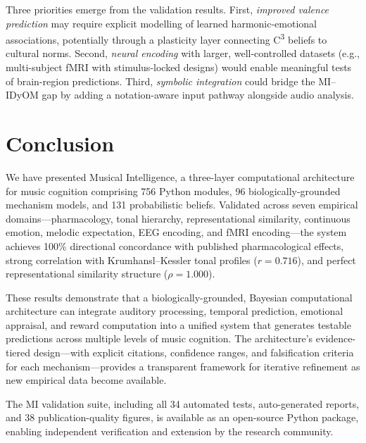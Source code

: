 \documentclass[twocolumn,10pt]{article}
\newcommand{\cthree}{C\textsuperscript{3}}
\begin{document}
Three priorities emerge from the validation results. First, \textit{improved valence prediction} may require explicit modelling of learned harmonic-emotional associations, potentially through a plasticity layer connecting \cthree{} beliefs to cultural norms. Second, \textit{neural encoding} with larger, well-controlled datasets (e.g., multi-subject fMRI with stimulus-locked designs) would enable meaningful tests of brain-region predictions. Third, \textit{symbolic integration} could bridge the MI--IDyOM gap by adding a notation-aware input pathway alongside audio analysis.

\section{Conclusion}

We have presented Musical Intelligence, a three-layer computational architecture for music cognition comprising 756 Python modules, 96 biologically-grounded mechanism models, and 131 probabilistic beliefs. Validated across seven empirical domains---pharmacology, tonal hierarchy, representational similarity, continuous emotion, melodic expectation, EEG encoding, and fMRI encoding---the system achieves 100\% directional concordance with published pharmacological effects, strong correlation with Krumhansl--Kessler tonal profiles ($r = 0.716$), and perfect representational similarity structure ($\rho = 1.000$).

These results demonstrate that a biologically-grounded, Bayesian computational architecture can integrate auditory processing, temporal prediction, emotional appraisal, and reward computation into a unified system that generates testable predictions across multiple levels of music cognition. The architecture's evidence-tiered design---with explicit citations, confidence ranges, and falsification criteria for each mechanism---provides a transparent framework for iterative refinement as new empirical data become available.

The MI validation suite, including all 34 automated tests, auto-generated reports, and 38 publication-quality figures, is available as an open-source Python package, enabling independent verification and extension by the research community.

\small


\end{document}
